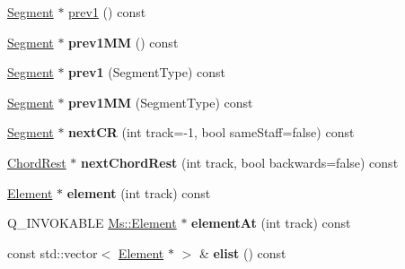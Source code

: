 \begin{DoxyCompactItemize}
\item 
\hyperlink{class_ms_1_1_segment}{Segment} $\ast$ \hyperlink{class_ms_1_1_segment_a07a0b52e5f58941bd85ca307455e62c6}{prev1} () const
\item 
\mbox{\label{class_ms_1_1_segment_a166e457ef0cd1b1a946ed83591d420fd}} 
\hyperlink{class_ms_1_1_segment}{Segment} $\ast$ {\bfseries prev1\+MM} () const
\item 
\mbox{\label{class_ms_1_1_segment_a77773b88b7154a03c1cd664dfecb8cf6}} 
\hyperlink{class_ms_1_1_segment}{Segment} $\ast$ {\bfseries prev1} (Segment\+Type) const
\item 
\mbox{\label{class_ms_1_1_segment_a9da5bed337b49f6603f31319a3a73619}} 
\hyperlink{class_ms_1_1_segment}{Segment} $\ast$ {\bfseries prev1\+MM} (Segment\+Type) const
\item 
\mbox{\label{class_ms_1_1_segment_af72e054dc7896adb071659dea6eff6b1}} 
\hyperlink{class_ms_1_1_segment}{Segment} $\ast$ {\bfseries next\+CR} (int track=-\/1, bool same\+Staff=false) const
\item 
\mbox{\label{class_ms_1_1_segment_a9f84e65ea1cc200227a75b058ab8e8d8}} 
\hyperlink{class_ms_1_1_chord_rest}{Chord\+Rest} $\ast$ {\bfseries next\+Chord\+Rest} (int track, bool backwards=false) const
\item 
\mbox{\label{class_ms_1_1_segment_a0a42bbe78c8e76c62fe4e3591b2eff2e}} 
\hyperlink{class_ms_1_1_element}{Element} $\ast$ {\bfseries element} (int track) const
\item 
\mbox{\label{class_ms_1_1_segment_a89f0f4996e4b2fd355ffb040b7029891}} 
Q\+\_\+\+I\+N\+V\+O\+K\+A\+B\+LE \hyperlink{class_ms_1_1_element}{Ms\+::\+Element} $\ast$ {\bfseries element\+At} (int track) const
\item 
\mbox{\label{class_ms_1_1_segment_a37a7c2088621a49ebefcd6f0e1e65da7}} 
const std\+::vector$<$ \hyperlink{class_ms_1_1_element}{Element} $\ast$ $>$ \& {\bfseries elist} () const
\item 
\mbox{\label{class_ms_1_1_segment_ac0913af28a1cd7cfa535f7817143f540}} 

\end{DoxyCompactItemize}
